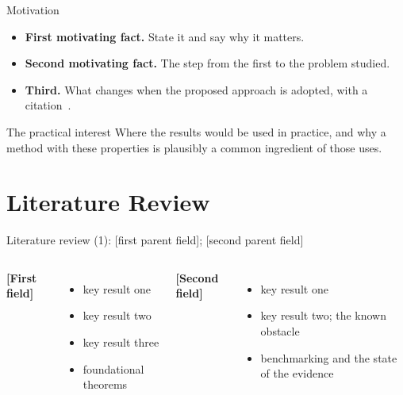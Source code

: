 \documentclass[aspectratio=43, 11pt, xcolor=dvipsnames, compress]{beamer}
\renewcommand{\cite}[2][]{\unskip}   %
\begin{document}
\begin{frame}{Motivation}
  \small
  \begin{itemize}
    \item \textbf{First motivating fact.} State it and say why it matters.
    \item \textbf{Second motivating fact.} The step from the first to the problem studied.
    \item \textbf{Third.} What changes when the proposed approach is adopted, with a citation~\cite{example_article}.
  \end{itemize}
  \begin{alertblock}{The practical interest}
    Where the results would be used in practice, and why a method with these properties is plausibly a common ingredient of those uses.
  \end{alertblock}
\end{frame}

\section{Literature Review}

\begin{frame}{Literature review (1): [first parent field]; [second parent field]}
  \small
  \begin{columns}[T]
      \textbf{[First field]}
      \begin{itemize}
        \item key result one~\cite{example_article}
        \item key result two~\cite{example_inproceedings}
        \item key result three
        \item foundational theorems~\cite{example_book}
      \end{itemize}
      \textbf{[Second field]}
      \begin{itemize}
        \item key result one~\cite{example_article}
        \item key result two; the known obstacle~\cite{example_inproceedings}
        \item benchmarking and the state of the evidence~\cite{example_book}
      \end{itemize}
  \end{columns}
\end{frame}
\end{document}
